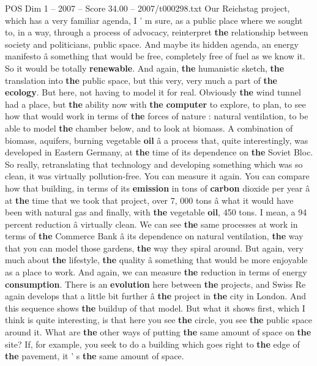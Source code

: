 \begin{textsample}{POS Dim 1 – 2007 – Score 34.00 – 2007/t000298.txt}
Our Reichstag project, which has a very familiar agenda, I ' m sure, as a public place where we sought to, in a way, through a process of advocacy, reinterpret \textbf{the} relationship between society and politicians, public space.
And maybe its hidden agenda, an energy manifesto â something that would be free, completely free of fuel as we know it.
So it would be totally \textbf{renewable}.
And again, \textbf{the} humanistic sketch, \textbf{the} translation into \textbf{the} public space, but this very, very much a part of \textbf{the} \textbf{ecology}.
But here, not having to model it for real.
Obviously \textbf{the} wind tunnel had a place, but \textbf{the} ability now with \textbf{the} \textbf{computer} to explore, to plan, to see how that would work in terms of \textbf{the} forces of nature : natural ventilation, to be able to model \textbf{the} chamber below, and to look at biomass.
A combination of biomass, aquifers, burning vegetable \textbf{oil} â a process that, quite interestingly, was developed in Eastern Germany, at \textbf{the} time of its dependence on \textbf{the} Soviet Bloc.
So really, retranslating that technology and developing something which was so clean, it was virtually pollution-free.
You can measure it again.
You can compare how that building, in terms of its \textbf{emission} in tons of \textbf{carbon} dioxide per year â at \textbf{the} time that we took that project, over 7, 000 tons â what it would have been with natural gas and finally, with \textbf{the} vegetable \textbf{oil}, 450 tons.
I mean, a 94 percent reduction â virtually clean.
We can see \textbf{the} same processes at work in terms of \textbf{the} Commerce Bank â its dependence on natural ventilation, \textbf{the} way that you can model those gardens, \textbf{the} way they spiral around.
But again, very much about \textbf{the} lifestyle, \textbf{the} quality â something that would be more enjoyable as a place to work.
And again, we can measure \textbf{the} reduction in terms of energy \textbf{consumption}.
There is an \textbf{evolution} here between \textbf{the} projects, and Swiss Re again develops that a little bit further â \textbf{the} project in \textbf{the} city in London.
And this sequence shows \textbf{the} buildup of that model.
But what it shows first, which I think is quite interesting, is that here you see \textbf{the} circle, you see \textbf{the} public space around it.
What are \textbf{the} other ways of putting \textbf{the} same amount of space on \textbf{the} site?
If, for example, you seek to do a building which goes right to \textbf{the} edge of \textbf{the} pavement, it ' s \textbf{the} same amount of space.

\end{textsample}
